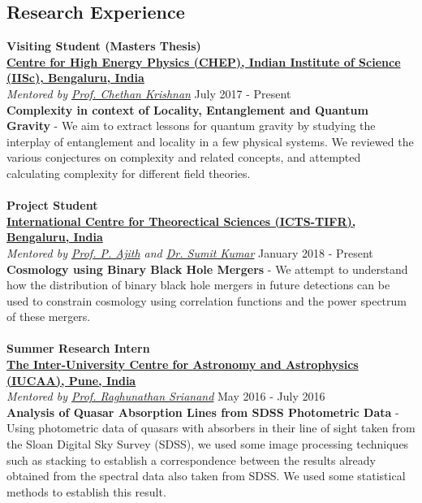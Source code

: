 \documentclass[margin, centered]{res}
\begin{document}
\begin{resume}
\section{Research Experience}
\textbf{Visiting Student (Masters Thesis)}
\\
\textbf{\href{http://chep.iisc.ac.in/}{Centre for High Energy Physics (CHEP), Indian Institute of Science (IISc), Bengaluru, India}}\\
\emph{Mentored by \href{http://chep.iisc.ac.in/Personnel/pages/chethan/index.html}{Prof. Chethan Krishnan}} \hfill July 2017 - Present\\
\textbf{Complexity in context of Locality, Entanglement and Quantum Gravity} - We aim to extract lessons for quantum gravity by studying the interplay of entanglement and locality in a few physical systems. We reviewed the various conjectures on complexity and related concepts, and attempted calculating complexity for different field theories.
\\
\\
\textbf{Project Student}
\\
\textbf{\href{https://icts.res.in/}{International Centre for Theorectical Sciences (ICTS-TIFR), Bengaluru, India}}\\
\emph{Mentored by \href{https://home.icts.res.in/~ajith/Home.html}{Prof. P. Ajith} and \href{https://www.icts.res.in/people/sumit-kumar}{Dr. Sumit Kumar}} \hfill January 2018 - Present\\
\textbf{Cosmology using Binary Black Hole Mergers} - We attempt to understand how the distribution of binary black hole mergers in future detections can be used to constrain cosmology using correlation functions and the power spectrum of these mergers.
\\
\\
\textbf{Summer Research Intern}
\\
\textbf{\href{http://www.iucaa.ernet.in/}{The Inter-University Centre for Astronomy and Astrophysics (IUCAA), Pune, India}}
\\
\emph{Mentored by \href{http://www.iucaa.ernet.in/~anand/}{Prof. Raghunathan Srianand}} \hfill May 2016 - July 2016\\
\textbf{Analysis of Quasar Absorption Lines from SDSS Photometric Data} - Using photometric data of quasars with absorbers in their line of sight taken from the Sloan Digital Sky Survey (SDSS), we used some image processing techniques such as stacking to establish a correspondence between the results already obtained from the spectral data also taken from SDSS. We used some statistical methods to establish this result. \\

\end{resume}
\end{document}
